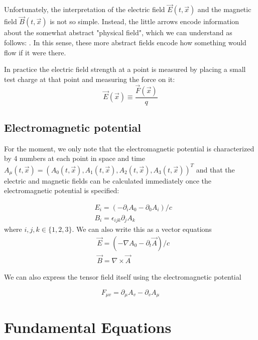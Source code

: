 Unfortunately, the interpretation of the electric field $\vec{E}(t, \vec{x})$ and the magnetic field $\vec{B}(t, \vec{x})$ is not so simple. Instead, the little arrows encode information about the somewhat abstract "physical field", which we can understand as follows: . In this sense, these more abstract fields encode how something would
flow if it were there.
\begin{qt}
    In practice the electric field strength at a point is measured by placing a small test charge at that point and measuring the force on it:
    \begin{equation}
\vec{E}(\vec{x}) \equiv \frac{\vec{F}(\vec{x})}{q}
\end{equation}
\end{qt}
\subsection{Electromagnetic potential}
For the moment, we only note that the electromagnetic potential is characterized by 4 numbers at each point in space and time $A_{\mu}(t, \vec{x})=\left(A_{0}(t, \vec{x}), A_{1}(t, \vec{x}), A_{2}(t, \vec{x}), A_{3}(t, \vec{x})\right)^{T}$ and that the electric and magnetic fields can be calculated immediately once the electromagnetic potential is specified:
\begin{qt}
    \begin{equation}
\begin{aligned}
&E_{i}=\left(-\partial_{i} A_{0}-\partial_{0} A_{i}\right) / c\\
&B_{i}=\epsilon_{i j k} \partial_{j} A_{k}
\end{aligned}
\end{equation}
where $i, j, k \in\{1,2,3\} .$ We can also write this as a vector equations
\begin{equation}
\begin{aligned}
&\vec{E}=\left(-\nabla A_{0}-\partial_{t} \vec{A}\right) / c\\
&\vec{B}=\nabla \times \vec{A}
\end{aligned}
\end{equation}
\end{qt}
We can also express the tensor field itself using the electromagnetic potential
\begin{qt}
    \begin{equation}
F_{\mu v}=\partial_{\mu} A_{v}-\partial_{v} A_{\mu}
\end{equation}
\end{qt}

\section{Fundamental Equations}
